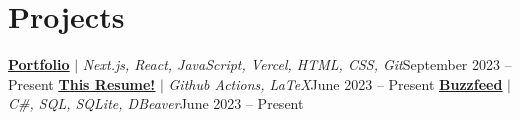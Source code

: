 
\section{Projects}

\resumeSubHeadingListStart
\resumeProjectHeading
{\textbf{\href{https://jaychen.app}{\underline{Portfolio}}} $|$ \emph{Next.js, React, JavaScript, Vercel, HTML, CSS, Git}}{September 2023 -- Present}
\resumeItemListStart
{}
\resumeItemListEnd
\resumeProjectHeading
{\textbf{\href{https://github.com/jundachen10/jays_resume}{\underline{This Resume!}}} $|$ \emph{Github Actions, LaTeX}}{June 2023 -- Present}
\resumeItemListStart
{}
\resumeItemListEnd
\resumeProjectHeading
{\textbf{\href{https://github.com/jundachen10/buzzfeed}{\underline{Buzzfeed}}} $|$ \emph{C\#, SQL, SQLite, DBeaver}}{June 2023 -- Present}
\resumeItemListStart
{}
\resumeItemListEnd
\resumeSubHeadingListEnd